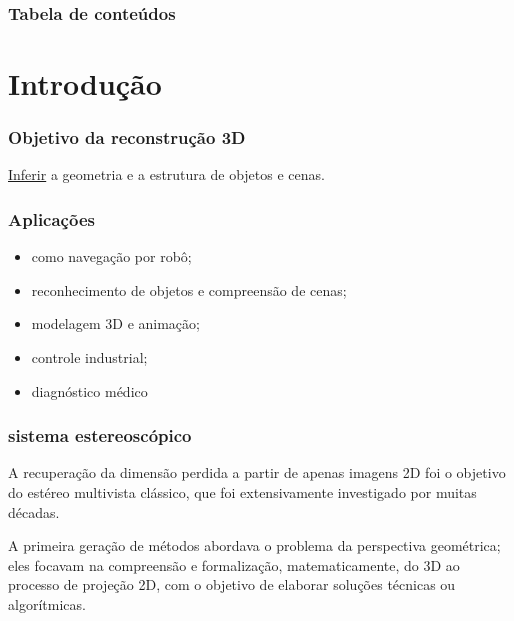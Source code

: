 \begin{frame}
\frametitle{Tabela de conteúdos}
\tableofcontents
\end{frame}


\section{Introdução}

\begin{frame}
  \frametitle{Objetivo da reconstrução 3D}

  \underline{Inferir} a geometria e a estrutura de objetos e cenas.

\end{frame}


\begin{frame}
  \frametitle{Aplicações}
\begin{itemize}
  \item como navegação por robô;
  \item reconhecimento de objetos e compreensão de cenas;
  \item modelagem 3D e animação;
  \item controle industrial;
  \item diagnóstico médico
\end{itemize}

\end{frame}


\begin{frame}
  \frametitle{sistema estereoscópico}
A recuperação da dimensão perdida a partir de apenas imagens 2D foi o objetivo
do estéreo multivista clássico, que foi extensivamente investigado por
muitas décadas.

A primeira geração de métodos abordava o problema da perspectiva geométrica;
eles focavam na compreensão e formalização, matematicamente, do 3D ao
processo de projeção 2D, com o objetivo de elaborar soluções técnicas ou
algorítmicas.

\end{frame}

